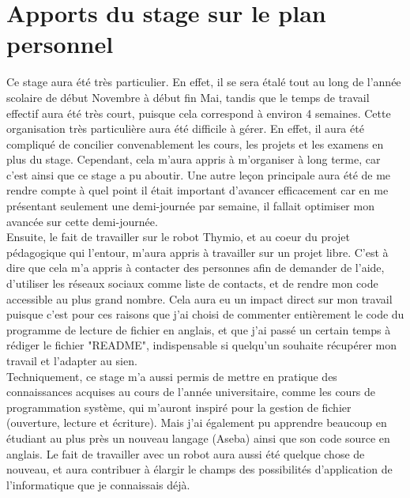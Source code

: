 \documentclass[a4paper, 12pt]{report}
\begin{document}
\section{Apports du stage sur le plan personnel}
Ce stage aura été très particulier. En effet, il se sera étalé tout au long de l'année scolaire de début Novembre à début fin Mai, tandis que le temps de travail effectif aura été très court, puisque cela correspond à environ 4 semaines. Cette organisation très particulière aura été difficile à gérer. En effet, il aura été compliqué de concilier convenablement les cours, les projets et les examens en plus du stage. Cependant, cela m'aura appris à m'organiser à long terme, car c'est ainsi que ce stage a pu aboutir. Une autre leçon principale aura été de me rendre compte à quel point il était important d'avancer efficacement car en me présentant seulement une demi-journée par semaine, il fallait optimiser mon avancée sur cette demi-journée.\\
Ensuite, le fait de travailler sur le robot Thymio, et au coeur du projet pédagogique qui l'entour, m'aura appris à travailler sur un projet libre. C'est à dire que cela m'a appris à contacter des personnes afin de demander de l'aide, d'utiliser les réseaux sociaux comme liste de contacts, et de rendre mon code accessible au plus grand nombre. Cela aura eu un impact direct sur mon travail puisque c'est pour ces raisons que j'ai choisi de commenter entièrement le code du programme de lecture de fichier en anglais, et que j'ai passé un certain temps à rédiger le fichier "README", indispensable si quelqu'un souhaite récupérer mon travail et l'adapter au sien.\\
Techniquement, ce stage m'a aussi permis de mettre en pratique des connaissances acquises au cours de l'année universitaire, comme les cours de programmation système, qui m'auront inspiré pour la gestion de fichier (ouverture, lecture et écriture). Mais j'ai également pu apprendre beaucoup en étudiant au plus près un nouveau langage (Aseba) ainsi que son code source en anglais. Le fait de travailler avec un robot aura aussi été quelque chose de nouveau, et aura contribuer à élargir le champs des possibilités d'application de l'informatique que je connaissais déjà. 
\end{document}
